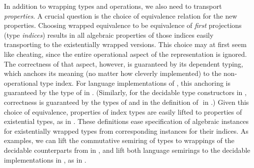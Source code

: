\documentclass[acmsmall,screen]{acmart}
\begin{document}
In addition to wrapping types and operations, we also need to transport \emph{properties}.
A crucial question is the choice of equivalence relation for the new properties.
Choosing wrapped equivalence to be equivalence of \emph{first} projections (type \emph{indices}) results in all algebraic properties of those indices easily transporting to the existentially wrapped versions.
This choice may at first seem like cheating, since the entire operational aspect of the representation is ignored.
The correctness of that aspect, however, is guaranteed by its dependent typing, which anchors its meaning (no matter how cleverly implemented) to the non-operational type index.
For language implementations of , this anchoring is guaranteed by the type of  in .
(Similarly, for the decidable type constructors in , correctness is guaranteed by the types of  and  in the definition of ‌ in .)
Given this choice of equivalence, properties of index types are easily lifted to properties of existential types, as in .
These definitions ease specification of algebraic instances for existentially wrapped types from corresponding instances for their indices.
\rnc{}
As examples, we can lift the commutative semiring of types to wrappings of the decidable counterparts from  in , and lift both language semirings to the decidable implementations in , as in .

\end{document}
